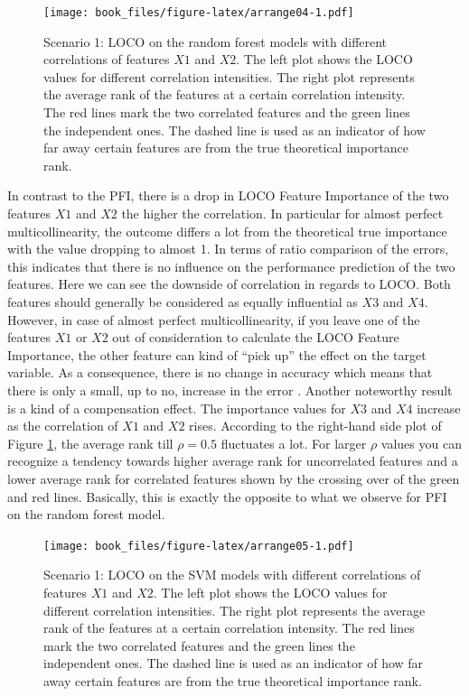 \documentclass[]{krantz}
\begin{document}
\begin{figure}
\centering
\texttt{[image: book\_files/figure-latex/arrange04-1.pdf]}
\caption{\label{fig:arrange04}Scenario 1: LOCO on the random forest models
with different correlations of features \(X1\) and \(X2\). The left plot
shows the LOCO values for different correlation intensities. The right
plot represents the average rank of the features at a certain
correlation intensity. The red lines mark the two correlated features
and the green lines the independent ones. The dashed line is used as an
indicator of how far away certain features are from the true theoretical
importance rank.}
\end{figure}

In contrast to the PFI, there is a drop in LOCO Feature Importance of
the two features \(X1\) and \(X2\) the higher the correlation. In
particular for almost perfect multicollinearity, the outcome differs a
lot from the theoretical true importance with the value dropping to
almost 1. In terms of ratio comparison of the errors, this indicates
that there is no influence on the performance prediction of the two
features. Here we can see the downside of correlation in regards to
LOCO. Both features should generally be considered as equally
influential as \(X3\) and \(X4\). However, in case of almost perfect
multicollinearity, if you leave one of the features \(X1\) or \(X2\) out
of consideration to calculate the LOCO Feature Importance, the other
feature can kind of ``pick up'' the effect on the target variable. As a
consequence, there is no change in accuracy which means that there is
only a small, up to no, increase in the error \citep{parr2018}. Another
noteworthy result is a kind of a compensation effect. The importance
values for \(X3\) and \(X4\) increase as the correlation of \(X1\) and
\(X2\) rises. According to the right-hand side plot of Figure
\ref{fig:arrange04}, the average rank till \(\rho = 0.5\) fluctuates a
lot. For larger \(\rho\) values you can recognize a tendency towards
higher average rank for uncorrelated features and a lower average rank
for correlated features shown by the crossing over of the green and red
lines. Basically, this is exactly the opposite to what we observe for
PFI on the random forest model.

\begin{figure}
\centering
\texttt{[image: book\_files/figure-latex/arrange05-1.pdf]}
\caption{\label{fig:arrange05}Scenario 1: LOCO on the SVM models with
different correlations of features \(X1\) and \(X2\). The left plot
shows the LOCO values for different correlation intensities. The right
plot represents the average rank of the features at a certain
correlation intensity. The red lines mark the two correlated features
and the green lines the independent ones. The dashed line is used as an
indicator of how far away certain features are from the true theoretical
importance rank.}
\end{figure}
\end{document}
